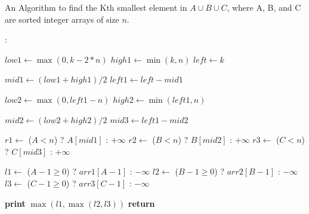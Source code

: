 \documentclass{article}
\begin{document}
{\fontsize{12}{15}\selectfont{
Below is the pseudocode which represents the logic of the C++ code we had written for the problem, in a more abstract and readable form. The function takes three sorted arrays (A, B, C), their size (n), and the value of k (position of the desired element). The function returns the 'k'th smallest element among all the arrays.
}

\begin{algorithm}
\small %
\caption{An Algorithm to find the Kth smallest element in $A \cup B \cup C$, where A, B, and C are sorted integer arrays of size $n$.}
\begin{algorithmic}[1]
    
    :

        \State $low1 \gets \max(0, k - 2*n)$
        \State $high1 \gets \min(k, n)$
        \State $left \gets k$

            \State $mid1 \gets (low1 + high1) / 2$
            \State $left1 \gets left - mid1$
            
            \State $low2 \gets \max(0, left1 - n)$
            \State $high2 \gets \min(left1, n)$
            
                \State $mid2 \gets (low2 + high2) / 2$
                \State $mid3 \gets left1 - mid2$
                
                \State $r1 \gets$ ($A < n$) ? $A[mid1]$ : $+\infty$
                \State $r2 \gets$ ($B < n$) ? $B[mid2]$ : $+\infty$
                \State $r3 \gets$ ($C < n$) ? $C[mid3]$ : $+\infty$
                
                \State $l1 \gets$ ($A - 1 \geq 0$) ? $arr1[A - 1]$ : $-\infty$
                \State $l2 \gets$ ($B - 1 \geq 0$) ? $arr2[B - 1]$ : $-\infty$
                \State $l3 \gets$ ($C - 1 \geq 0$) ? $arr3[C - 1]$ : $-\infty$
                
                    \State \textbf{print} $\max(l1, \max(l2, l3))$
                    \State \textbf{return}
                \EndIf


\end{algorithmic}
\end{algorithm}}
\end{document}
